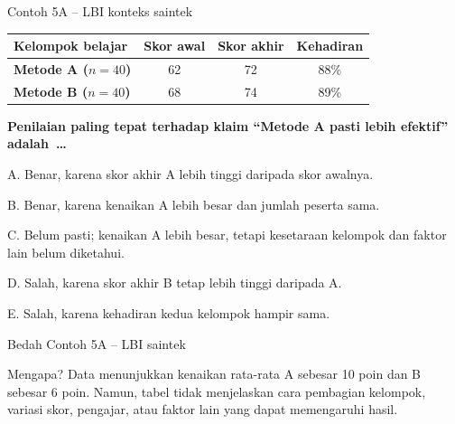 \begin{frame}[shrink=10]{Contoh 5A -- LBI konteks saintek}
  {\fontsize{9.7}{11.8}\selectfont
  \begin{tabularx}{\textwidth}{>{\bfseries}X c c c}
    \toprule
    \textbf{Kelompok belajar} & \textbf{Skor awal} & \textbf{Skor akhir} & \textbf{Kehadiran} \\
    \midrule
    Metode A ($n=40$) & 62 & 72 & 88\% \\
    Metode B ($n=40$) & 68 & 74 & 89\% \\
    \bottomrule
  \end{tabularx}}
  \vspace{0.10cm}
  {\bfseries Penilaian paling tepat terhadap klaim ``Metode A pasti lebih efektif'' adalah~\ldots}\par
  \vspace{0.07cm}
  {\fontsize{8.9}{10.8}\selectfont
  A. Benar, karena skor akhir A lebih tinggi daripada skor awalnya.\par\vspace{0.035cm}
  B. Benar, karena kenaikan A lebih besar dan jumlah peserta sama.\par\vspace{0.035cm}
  C. Belum pasti; kenaikan A lebih besar, tetapi kesetaraan kelompok dan faktor lain belum diketahui.\par\vspace{0.035cm}
  D. Salah, karena skor akhir B tetap lebih tinggi daripada A.\par\vspace{0.035cm}
  E. Salah, karena kehadiran kedua kelompok hampir sama.}
\end{frame}

\begin{frame}{Bedah Contoh 5A -- LBI saintek}
  \vspace{0.20cm}
  \begin{block}{Mengapa?}
    Data menunjukkan kenaikan rata-rata A sebesar 10 poin dan B sebesar 6 poin. Namun, tabel tidak menjelaskan cara pembagian kelompok, variasi skor, pengajar, atau faktor lain yang dapat memengaruhi hasil.
  \end{block}
  {\fontsize{10.5}{13.1}\selectfont
  \par\vspace{0.15cm}
  }
\end{frame}

